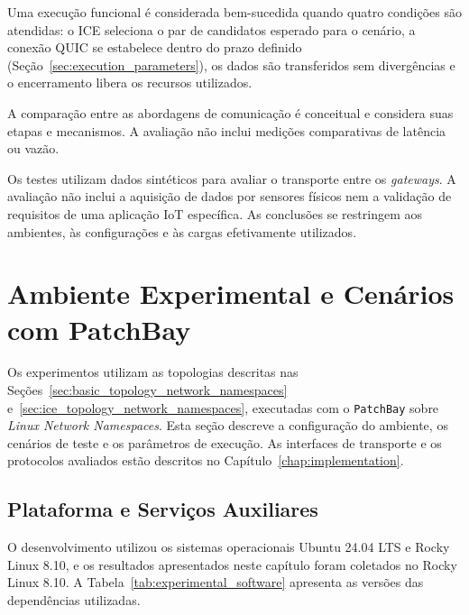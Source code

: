 Uma execução funcional é considerada bem-sucedida quando quatro condições são atendidas: o ICE seleciona o par de candidatos esperado para o cenário, a conexão QUIC se estabelece dentro do prazo definido (Seção~\ref{sec:execution_parameters}), os dados são transferidos sem divergências e o encerramento libera os recursos utilizados.

A comparação entre as abordagens de comunicação é conceitual e considera suas etapas e mecanismos. A avaliação não inclui medições comparativas de latência ou vazão.

Os testes utilizam dados sintéticos para avaliar o transporte entre os \textit{gateways}. A avaliação não inclui a aquisição de dados por sensores físicos nem a validação de requisitos de uma aplicação IoT específica. As conclusões se restringem aos ambientes, às configurações e às cargas efetivamente utilizados.

\section{Ambiente Experimental e Cenários com PatchBay}
\label{sec:experimental_patchbay}

Os experimentos utilizam as topologias descritas nas Seções~\ref{sec:basic_topology_network_namespaces} e~\ref{sec:ice_topology_network_namespaces}, executadas com o \texttt{PatchBay} sobre \textit{Linux Network Namespaces}. Esta seção descreve a configuração do ambiente, os cenários de teste e os parâmetros de execução. As interfaces de transporte e os protocolos avaliados estão descritos no Capítulo~\ref{chap:implementation}.

\subsection{Plataforma e Serviços Auxiliares}

O desenvolvimento utilizou os sistemas operacionais Ubuntu 24.04 LTS e Rocky Linux 8.10, e os resultados apresentados neste capítulo foram coletados no Rocky Linux 8.10. A Tabela~\ref{tab:experimental_software} apresenta as versões das dependências utilizadas.

